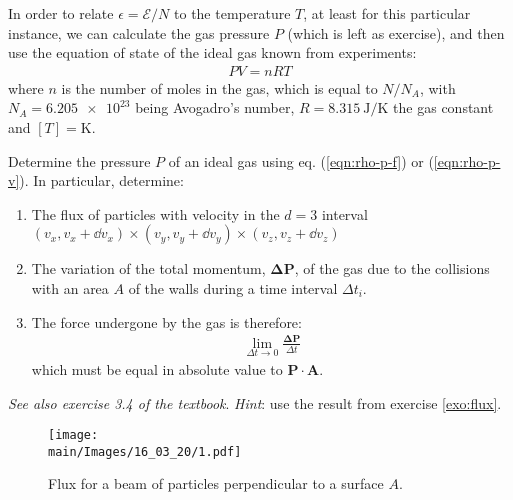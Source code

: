 \documentclass[../../main.tex]{subfiles}
\begin{document}
In order to relate $\epsilon = \mathcal{E}/N$ to the temperature $T$, at least for this particular instance, we can calculate the gas pressure $P$ (which is left as exercise), and then use the equation of state of the ideal gas known from experiments:
\begin{align} \label{eqn:state}
    PV = nRT
\end{align}
where $n$ is the number of moles in the gas, which is equal to $N/N_A$, with $N_A = \num{6.205e23}$ being Avogadro's number, $R = \SI{8.315}{\J\per\K}$ the gas constant and $[T] = \si{\K}$.

\begin{exo}
    Determine the pressure $P$ of an ideal gas using eq. (\ref{eqn:rho-p-f}) or (\ref{eqn:rho-p-v}). In particular, determine:
    \begin{enumerate}[label=\alph*.]
        \item The flux of particles with velocity in the $d=3$ interval $(v_x, v_x+\dd{v_x}) \times (v_y, v_y + \dd{v_y}) \times (v_z, v_z + \dd{v_z})$
        \item The variation of the total momentum, $\bm{\Delta P}$, of the gas due to the collisions with an area $A$ of the walls during a time interval $\Delta t_i$.
        \item The force undergone by the gas is therefore:
        \begin{align*}
            \lim_{\Delta t \to 0} \frac{\bm{\Delta P}}{\Delta t} 
        \end{align*}
        which must be equal in absolute value to $\bm{P} \cdot \bm{A}$. 
    \end{enumerate}

    \textit{See also exercise 3.4 of the textbook}. \textit{Hint}: use the result from exercise \ref{exo:flux}. 

    \medskip

    
\end{exo}

\begin{figure}[htp]
    \centering
    \texttt{[image: \\main/Images/16\_03\_20/1.pdf]}
    \caption{Flux for a beam of particles perpendicular to a surface $A$.\label{fig:flux}}
\end{figure}
\end{document}
